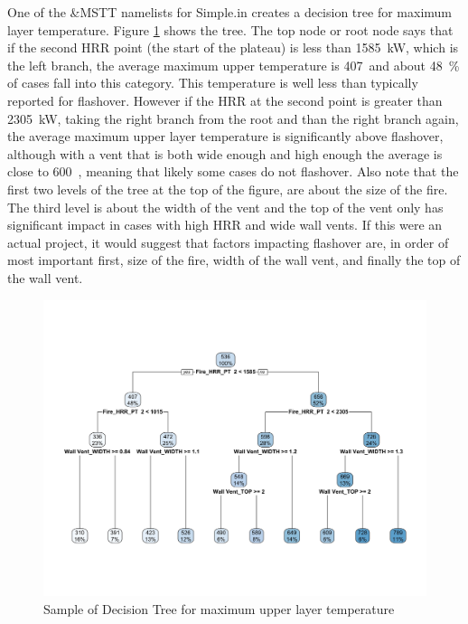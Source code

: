 \documentclass[12pt,twoside]{book}
\begin{document}
One of the {\ct \&MSTT} namelists for Simple.in creates a decision tree for maximum layer temperature. Figure \ref{simple_tree_temp} shows the tree. The top node or root node says that if the second HRR point (the start of the plateau) is less than 1585~kW, which is the left branch, the average maximum upper temperature is 407~\degc and about 48~\% of cases fall into this category. This temperature is well less than typically reported for flashover. However if the HRR at the second point is greater than 2305~kW, taking the right branch from the root and than the right branch again, the average maximum upper layer temperature is significantly above flashover, although with a vent that is both wide enough and high enough the average is close to 600~\degc, meaning that likely some cases do not flashover. Also note that the first two levels of the tree at the top of the figure, are about the size of the fire. The third level is about the width of the vent and the top of the vent only has significant impact in cases with high HRR and wide wall vents. If this were an actual project, it would suggest that factors impacting flashover are, in order of most important first, size of the fire, width of the wall vent, and finally the top of the wall vent.

\begin{figure}[h!]
\centering
\includegraphics[width=6.5in]{FIGURES/simple_tree_temp.jpeg}
\caption{Sample of Decision Tree for maximum upper layer temperature}
\label{simple_tree_temp}
\end{figure}

%
%
\end{document}
